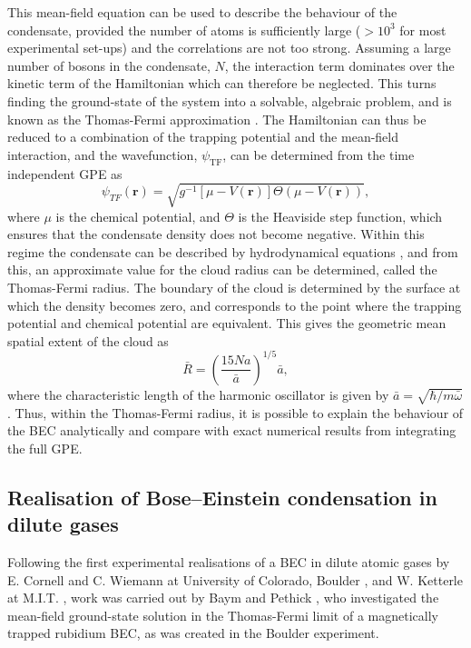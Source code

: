 This mean-field equation can be used to describe the behaviour of the condensate, provided the number of atoms is sufficiently large ($>10^3$ for most experimental set-ups) and the correlations are not too strong. Assuming a large number of bosons in the condensate, $N$, the interaction term dominates over the kinetic term of the Hamiltonian which can therefore be neglected. This turns finding the ground-state of the system into a solvable, algebraic problem, and is known as the Thomas-Fermi approximation \cite[~p. 84]{BK:Ueda_2010}. The Hamiltonian can thus be reduced to a combination of the trapping potential and the mean-field interaction, and the wavefunction, $\psi_{\textrm{TF}}$, can be determined from the time independent GPE as
\begin{equation}
\psi_{TF}(\textbf{r}) = \sqrt{ g^{-1}[\mu - V(\textbf{r})] \Theta(\mu - V(\textbf{r}))},
\end{equation}
where $\mu$ is the chemical potential, and $\Theta$ is the Heaviside step function, which ensures that the condensate density does not become negative. Within this regime the condensate can be described by hydrodynamical equations \cite[Pg.~180]{BK:Pitaevskii_Stringari_2003}, and from this, an approximate value for the cloud radius can be determined, called the Thomas-Fermi radius. The boundary of the cloud is determined by the surface at which the density becomes zero, and corresponds to the point where the trapping potential and chemical potential are equivalent. This gives the geometric mean spatial extent of the cloud \cite[~p. 169]{BK:Pethick_Smith_2008} as
\begin{equation}
\bar{R} = \left(\frac{15Na}{\bar{a}}\right)^{1/5}\bar{a},
\end{equation}
where the characteristic length of the harmonic oscillator is given by
$\bar{a} = \sqrt{{\hbar}/{m\bar{\omega}}}$. Thus, within the Thomas-Fermi radius, it is possible to explain the behaviour of the BEC analytically and compare with exact numerical results from integrating the full GPE.

\subsection{Realisation of Bose--Einstein condensation in dilute gases}\label{sub:becdev}
Following the first experimental realisations of a BEC in dilute atomic gases by E. Cornell and C. Wiemann at University of Colorado, Boulder \cite{BEC:Cornell_science_1995}, and W. Ketterle at M.I.T. \cite{BEC:Ketterle_prl_1995}, work was carried out by Baym and Pethick \cite{BEC:Baym_prl_1996}, who investigated the mean-field ground-state solution in the Thomas-Fermi limit of a magnetically trapped rubidium BEC, as was created in the Boulder experiment.

